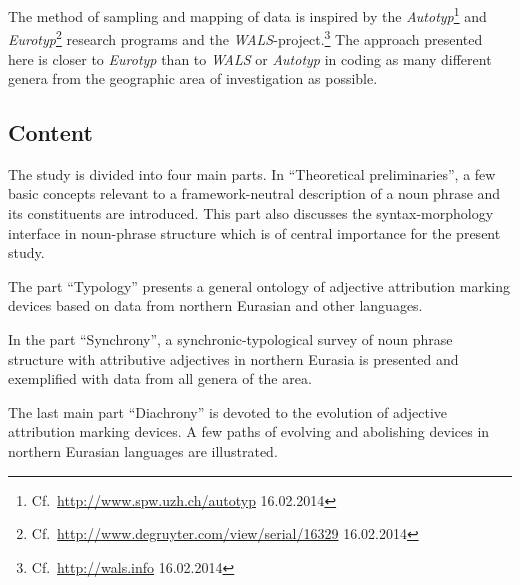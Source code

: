 The method of sampling and mapping of data is inspired by the \emph{Autotyp}\footnote{Cf.~\url{http://www.spw.uzh.ch/autotyp} 16.02.2014} and \emph{Eurotyp}\footnote{Cf.~\url{http://www.degruyter.com/view/serial/16329} 16.02.2014} research programs and the \emph{WALS}-project.\footnote{Cf.~\url{http://wals.info} 16.02.2014} The approach presented here is closer to \emph{Eurotyp} than to \emph{WALS} or \emph{Autotyp} in coding as many different genera from the geographic area of investigation as possible.

\subsection*{Content}

The study is divided into four main parts. In “Theoretical preliminaries”, a few basic concepts relevant to a framework-neutral description of a noun phrase and its constituents are introduced. This part also discusses the syntax-morphology interface in noun-phrase structure which is of central importance for the present study.

The part “Typology” presents a general ontology of adjective attribution marking devices based on data from northern Eurasian and other languages.

In the part “Synchrony”, a synchronic-typological survey of noun phrase structure with attributive adjectives in northern Eurasia is presented and exemplified with data from all genera of the area.

The last main part “Diachrony” is devoted to the evolution of adjective attribution marking devices. A few paths of evolving and abolishing devices in northern Eurasian languages are illustrated.
